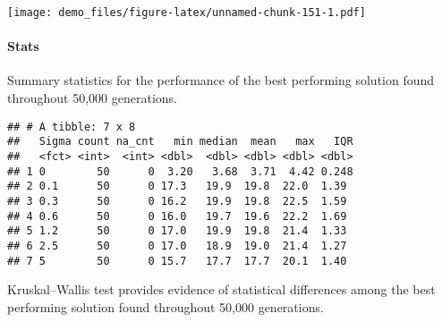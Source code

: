 \documentclass[]{book}
\newenvironment{Shaded}{\begin{snugshade}}{\end{snugshade}}
\newcommand{\DataTypeTok}[1]{\textcolor[rgb]{0.13,0.29,0.53}{#1}}
\newcommand{\KeywordTok}[1]{\textcolor[rgb]{0.13,0.29,0.53}{\textbf{#1}}}
\newcommand{\NormalTok}[1]{#1}
\newcommand{\OperatorTok}[1]{\textcolor[rgb]{0.81,0.36,0.00}{\textbf{#1}}}
\newcommand{\OtherTok}[1]{\textcolor[rgb]{0.56,0.35,0.01}{#1}}
\newcommand{\StringTok}[1]{\textcolor[rgb]{0.31,0.60,0.02}{#1}}
\let\oldparagraph\paragraph
\renewcommand{\paragraph}[1]{\oldparagraph{#1}\mbox{}}
\begin{document}
\texttt{[image: demo\_files/figure-latex/unnamed-chunk-151-1.pdf]}

\hypertarget{stats-70}{%
\paragraph{Stats}\label{stats-70}}

Summary statistics for the performance of the best performing solution found throughout 50,000 generations.

\begin{Shaded}
\end{Shaded}

\begin{verbatim}
## # A tibble: 7 x 8
##   Sigma count na_cnt   min median  mean   max   IQR
##   <fct> <int>  <int> <dbl>  <dbl> <dbl> <dbl> <dbl>
## 1 0        50      0  3.20   3.68  3.71  4.42 0.248
## 2 0.1      50      0 17.3   19.9  19.8  22.0  1.39 
## 3 0.3      50      0 16.2   19.9  19.8  22.5  1.59 
## 4 0.6      50      0 16.0   19.7  19.6  22.2  1.69 
## 5 1.2      50      0 17.0   19.9  19.8  21.4  1.33 
## 6 2.5      50      0 17.0   18.9  19.0  21.4  1.27 
## 7 5        50      0 15.7   17.7  17.7  20.1  1.40
\end{verbatim}

Kruskal--Wallis test provides evidence of statistical differences among the best performing solution found throughout 50,000 generations.
\end{document}
